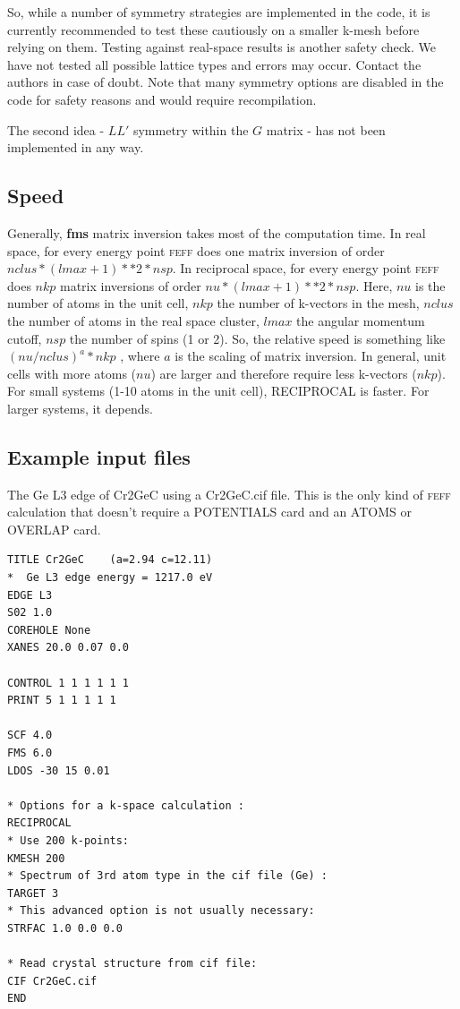 \documentclass[11pt,oneside]{report} %
\newcommand{\program}[1]{\textsc{#1}}
\newcommand{\feff}{\program{feff}}
\newcommand{\module}[1]{\textrm{\bf{#1}}}
\begin{document}
So, while a number of symmetry strategies are implemented in the code, it is currently recommended to test these cautiously on a smaller k-mesh before relying on them.  Testing against real-space results is another safety check.  We have not tested all possible lattice types and errors may occur.  Contact the authors in case of doubt.  Note that many symmetry options are disabled in the code for safety reasons and would require recompilation.

The second idea - $LL'$ symmetry within the $G$ matrix - has not been implemented in any way.


\subsection{Speed}
Generally, \module{fms} matrix inversion takes most of the computation time.
In real space, for every energy point {\feff} does one matrix inversion of order $nclus*(lmax+1)**2*nsp$.
In reciprocal space, for every energy point {\feff} does $nkp$ matrix inversions of order $nu*(lmax+1)**2*nsp$.
 Here, $nu$ is the number of atoms in the unit cell, $nkp$ the number of k-vectors in the mesh, $nclus$ the number of atoms in the real space cluster, $lmax$ the angular momentum cutoff, $nsp$ the number of spins (1 or 2).
So, the relative speed is something like $(nu/nclus)^a * nkp$ , where $a$ is the scaling of matrix inversion.
In general, unit cells with more atoms ($nu$) are larger and therefore require less k-vectors ($nkp$).  For small systems (1-10 atoms in the unit cell), RECIPROCAL is faster.  For larger systems, it depends.


\subsection{Example input files}
\label{K-space-example-Cr2GeC}
The Ge L3 edge of Cr2GeC using a Cr2GeC.cif file.  This is the only kind of {\feff} calculation that doesn't require a POTENTIALS card and an ATOMS or OVERLAP card.

\begin{verbatim}
TITLE Cr2GeC    (a=2.94 c=12.11)
*  Ge L3 edge energy = 1217.0 eV
EDGE L3
S02 1.0
COREHOLE None
XANES 20.0 0.07 0.0

CONTROL 1 1 1 1 1 1
PRINT 5 1 1 1 1 1

SCF 4.0
FMS 6.0
LDOS -30 15 0.01

* Options for a k-space calculation :
RECIPROCAL
* Use 200 k-points:
KMESH 200
* Spectrum of 3rd atom type in the cif file (Ge) :
TARGET 3
* This advanced option is not usually necessary:
STRFAC 1.0 0.0 0.0

* Read crystal structure from cif file:
CIF Cr2GeC.cif
END
\end{verbatim}
\end{document}
